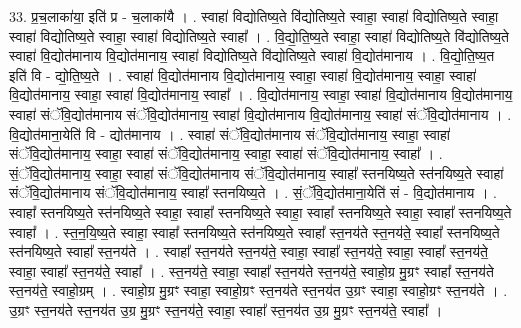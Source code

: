 \documentclass[17pt]{extarticle}
\begin{document}
33. प्र॒च॒लाका॑या॒ इति॑ प्र - च॒लाका॑यै । . स्वाहा॑ विद्योतिष्य॒ते वि॑द्योतिष्य॒ते स्वाहा॒ स्वाहा॑ विद्योतिष्य॒ते स्वाहा॒ स्वाहा॑ विद्योतिष्य॒ते स्वाहा॒ स्वाहा॑ विद्योतिष्य॒ते स्वाहा᳚ । . वि॒द्यो॒ति॒ष्य॒ते स्वाहा॒ स्वाहा॑ विद्योतिष्य॒ते वि॑द्योतिष्य॒ते स्वाहा॑ वि॒द्योत॑मानाय वि॒द्योत॑मानाय॒ स्वाहा॑ विद्योतिष्य॒ते वि॑द्योतिष्य॒ते स्वाहा॑ वि॒द्योत॑मानाय । . वि॒द्यो॒ति॒ष्य॒त इति॑ वि - द्यो॒ति॒ष्य॒ते । . स्वाहा॑ वि॒द्योत॑मानाय वि॒द्योत॑मानाय॒ स्वाहा॒ स्वाहा॑ वि॒द्योत॑मानाय॒ स्वाहा॒ स्वाहा॑ वि॒द्योत॑मानाय॒ स्वाहा॒ स्वाहा॑ वि॒द्योत॑मानाय॒ स्वाहा᳚ । . वि॒द्योत॑मानाय॒ स्वाहा॒ स्वाहा॑ वि॒द्योत॑मानाय वि॒द्योत॑मानाय॒ स्वाहा॑ संॅवि॒द्योत॑मानाय संॅवि॒द्योत॑मानाय॒ स्वाहा॑ वि॒द्योत॑मानाय वि॒द्योत॑मानाय॒ स्वाहा॑ संॅवि॒द्योत॑मानाय । . वि॒द्योत॑माना॒येति॑ वि - द्योत॑मानाय । . स्वाहा॑ संॅवि॒द्योत॑मानाय संॅवि॒द्योत॑मानाय॒ स्वाहा॒ स्वाहा॑ संॅवि॒द्योत॑मानाय॒ स्वाहा॒ स्वाहा॑ संॅवि॒द्योत॑मानाय॒ स्वाहा॒ स्वाहा॑ संॅवि॒द्योत॑मानाय॒ स्वाहा᳚ । . सं॒ॅवि॒द्योत॑मानाय॒ स्वाहा॒ स्वाहा॑ संॅवि॒द्योत॑मानाय संॅवि॒द्योत॑मानाय॒ स्वाहा᳚ स्तनयिष्य॒ते स्त॑नयिष्य॒ते स्वाहा॑ संॅवि॒द्योत॑मानाय संॅवि॒द्योत॑मानाय॒ स्वाहा᳚ स्तनयिष्य॒ते । . सं॒ॅवि॒द्योत॑माना॒येति॑ सं - वि॒द्योत॑मानाय । . स्वाहा᳚ स्तनयिष्य॒ते स्त॑नयिष्य॒ते स्वाहा॒ स्वाहा᳚ स्तनयिष्य॒ते स्वाहा॒ स्वाहा᳚ स्तनयिष्य॒ते स्वाहा॒ स्वाहा᳚ स्तनयिष्य॒ते स्वाहा᳚ । . स्त॒न॒यि॒ष्य॒ते स्वाहा॒ स्वाहा᳚ स्तनयिष्य॒ते स्त॑नयिष्य॒ते स्वाहा᳚ स्त॒नय॑ते स्त॒नय॑ते॒ स्वाहा᳚ स्तनयिष्य॒ते स्त॑नयिष्य॒ते स्वाहा᳚ स्त॒नय॑ते । . स्वाहा᳚ स्त॒नय॑ते स्त॒नय॑ते॒ स्वाहा॒ स्वाहा᳚ स्त॒नय॑ते॒ स्वाहा॒ स्वाहा᳚ स्त॒नय॑ते॒ स्वाहा॒ स्वाहा᳚ स्त॒नय॑ते॒ स्वाहा᳚ । . स्त॒नय॑ते॒ स्वाहा॒ स्वाहा᳚ स्त॒नय॑ते स्त॒नय॑ते॒ स्वाहो॒ग्र मु॒ग्रꣳ स्वाहा᳚ स्त॒नय॑ते स्त॒नय॑ते॒ स्वाहो॒ग्रम् । . स्वाहो॒ग्र मु॒ग्रꣳ स्वाहा॒ स्वाहो॒ग्रꣳ स्त॒नय॑ते स्त॒नय॑त उ॒ग्रꣳ स्वाहा॒ स्वाहो॒ग्रꣳ स्त॒नय॑ते । . उ॒ग्रꣳ स्त॒नय॑ते स्त॒नय॑त उ॒ग्र मु॒ग्रꣳ स्त॒नय॑ते॒ स्वाहा॒ स्वाहा᳚ स्त॒नय॑त उ॒ग्र मु॒ग्रꣳ स्त॒नय॑ते॒ स्वाहा᳚ । \newline
\end{document}
